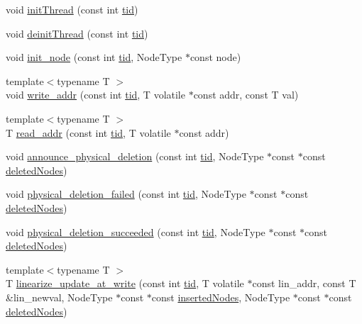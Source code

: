 \begin{DoxyCompactItemize}
\item 
void \hyperlink{classRQProvider_a3485da4cb5f94a1229cd31578b088f85}{init\+Thread} (const int \hyperlink{microbench_2main_8cpp_a9ca9869868fe7e7a38a921cc7de4103f}{tid})
\item 
void \hyperlink{classRQProvider_a3f20b96dfa5a47d9f59ada98e3322695}{deinit\+Thread} (const int \hyperlink{microbench_2main_8cpp_a9ca9869868fe7e7a38a921cc7de4103f}{tid})
\item 
void \hyperlink{classRQProvider_a2cd517d996a170c029435b638c9cf219}{init\+\_\+node} (const int \hyperlink{microbench_2main_8cpp_a9ca9869868fe7e7a38a921cc7de4103f}{tid}, Node\+Type $\ast$const node)
\item 
{\footnotesize template$<$typename T $>$ }\\void \hyperlink{classRQProvider_a2b627a253e65ffdbba9815d0ac3236cb}{write\+\_\+addr} (const int \hyperlink{microbench_2main_8cpp_a9ca9869868fe7e7a38a921cc7de4103f}{tid}, T volatile $\ast$const addr, const T val)
\item 
{\footnotesize template$<$typename T $>$ }\\T \hyperlink{classRQProvider_aa6dcae307b83ce0dc7890155f81659a2}{read\+\_\+addr} (const int \hyperlink{microbench_2main_8cpp_a9ca9869868fe7e7a38a921cc7de4103f}{tid}, T volatile $\ast$const addr)
\item 
void \hyperlink{classRQProvider_a29337e6766144d1c1a9aa752fe73fabf}{announce\+\_\+physical\+\_\+deletion} (const int \hyperlink{microbench_2main_8cpp_a9ca9869868fe7e7a38a921cc7de4103f}{tid}, Node\+Type $\ast$const $\ast$const \hyperlink{scxrecord_8h_ae536bce1bb8c0fffd7a3053f7d258f1e}{deleted\+Nodes})
\item 
void \hyperlink{classRQProvider_a1fb29a074556e0431ed22f2bee394c22}{physical\+\_\+deletion\+\_\+failed} (const int \hyperlink{microbench_2main_8cpp_a9ca9869868fe7e7a38a921cc7de4103f}{tid}, Node\+Type $\ast$const $\ast$const \hyperlink{scxrecord_8h_ae536bce1bb8c0fffd7a3053f7d258f1e}{deleted\+Nodes})
\item 
void \hyperlink{classRQProvider_a1bcce8dc80c1661b549a5ec6f9ee6d15}{physical\+\_\+deletion\+\_\+succeeded} (const int \hyperlink{microbench_2main_8cpp_a9ca9869868fe7e7a38a921cc7de4103f}{tid}, Node\+Type $\ast$const $\ast$const \hyperlink{scxrecord_8h_ae536bce1bb8c0fffd7a3053f7d258f1e}{deleted\+Nodes})
\item 
{\footnotesize template$<$typename T $>$ }\\T \hyperlink{classRQProvider_a632161f99e9c5792c70340e621ed22fd}{linearize\+\_\+update\+\_\+at\+\_\+write} (const int \hyperlink{microbench_2main_8cpp_a9ca9869868fe7e7a38a921cc7de4103f}{tid}, T volatile $\ast$const lin\+\_\+addr, const T \&lin\+\_\+newval, Node\+Type $\ast$const $\ast$const \hyperlink{scxrecord_8h_a0f26579d4b35e2dad20ee190a7986d08}{inserted\+Nodes}, Node\+Type $\ast$const $\ast$const \hyperlink{scxrecord_8h_ae536bce1bb8c0fffd7a3053f7d258f1e}{deleted\+Nodes})

\end{DoxyCompactItemize}
